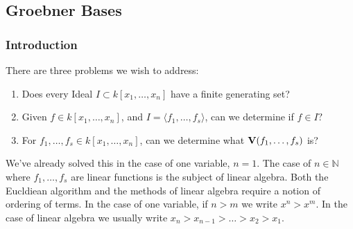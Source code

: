 \documentclass[../main.tex]{subfiles}
\begin{document}
\subsection{Groebner Bases}
%
\subsubsection{Introduction}

There are three problems we wish to address:

\begin{enumerate}
\item Does every Ideal $I\subset k[x_1,\hdots ,x_n]$ have a finite generating set?
\item Given $f\in k[x_1,\hdots ,x_n]$, and $I = \langle f_1,\hdots, f_s\rangle$, can we determine if $f\in I?$
\item For $f_1,\hdots, f_s \in k[x_1,\hdots ,x_n]$, can we determine what $\textbf{V}(f_1,\hdots, f_s)$ is?
\end{enumerate}

We've already solved this in the case of one variable, $n=1$. The case of $n\in \mathbb{N}$ where $f_1,\hdots, f_s$ are linear functions is the subject of linear algebra. Both the Eucldiean algorithm and the methods of linear algebra require a notion of ordering of terms. In the case of one variable, if $n>m$ we write $x^n>x^m$. In the case of linear algebra we usually write $x_n>x_{n-1}>\hdots > x_2 > x_1$. 
%
\end{document}
